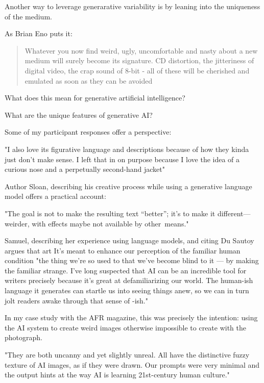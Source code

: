 Another way to leverage generarative variability is by leaning into the uniqueness of the medium. 

As Brian Eno puts it: 

\begin{quote}
    Whatever you now find weird, ugly, uncomfortable and nasty about a new medium will surely become its signature. CD distortion, the jitteriness of digital video, the crap sound of 8-bit - all of these will be cherished and emulated as soon as they can be avoided \cite{Eno2007-fl}
\end{quote}

What does this mean for generative artificial intelligence? 

What are the unique features of generative AI?


Some of my participant responses offer a perspective:

"I also love its figurative language and descriptions because of how they kinda just don't make sense. I left that in on purpose because I love the idea of a curious nose and a perpetually second-hand jacket"


Author Sloan, describing his creative process while using a generative language model offers a practical account:

 "The goal is not to make the resulting text “better”; it’s to make it different—weirder, with effects maybe not available by other means."



Samuel, describing her experience using language models, and citing Du Sautoy argues that art It’s meant to enhance our perception of the familiar human condition  "the thing we’re so used to that we’ve become blind to it — by making the familiar strange.
I’ve long suspected that AI can be an incredible tool for writers precisely because it’s great at defamiliarizing our world. The human-ish language it generates can startle us into seeing things anew, so we can in turn jolt readers awake through that sense of -ish."




In my case study with the AFR magazine, this was precisely the intention: using the AI system to create weird images otherwise impossible to create with the photograph. 


 "They are both uncanny and yet slightly unreal. All have the distinctive fuzzy texture of AI images, as if they were drawn. Our prompts were very minimal and the output hints at the way AI is learning 21st-century human culture."


